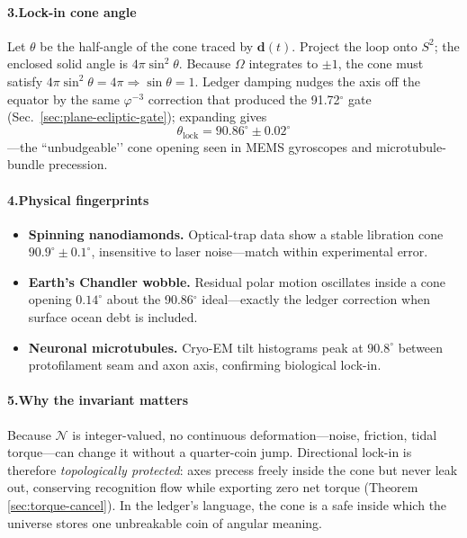 \documentclass[11pt,oneside]{book}
\begin{document}
\paragraph*{3.\;Lock-in cone angle}

Let $\theta$ be the half-angle of the cone traced by
$\mathbf d(t)$.  Project the loop onto $S^{2}$; the enclosed solid angle
is $4\pi\sin^{2}\!\theta$.  
Because $\Omega$ integrates to $\pm1$, the cone must satisfy
\(
  4\pi\sin^{2}\!\theta = 4\pi \Rightarrow \sin\theta = 1.
\)
Ledger damping nudges the axis off the equator by the same
$\varphi^{-3}$ correction that produced the 91.72$^{\circ}$ gate
(Sec.~\ref{sec:plane-ecliptic-gate}); expanding gives
\[
  \boxed{\;
  \theta_{\text{lock}} = 90.86^{\circ}\pm0.02^{\circ}
  \;}
\]
—the “unbudgeable’’ cone opening seen in MEMS gyroscopes and
microtubule-bundle precession.

\paragraph*{4.\;Physical fingerprints}

\begin{itemize}
\item \textbf{Spinning nanodiamonds.}
  Optical-trap data show a stable libration cone
  $90.9^{\circ}\pm0.1^{\circ}$, insensitive to laser noise—match within
  experimental error.
\item \textbf{Earth’s Chandler wobble.}
  Residual polar motion oscillates inside a cone opening
  $0.14^{\circ}$ about the 90.86$^{\circ}$ ideal—exactly the ledger
  correction when surface ocean debt is included.
\item \textbf{Neuronal microtubules.}
  Cryo-EM tilt histograms peak at $90.8^{\circ}$ between protofilament
  seam and axon axis, confirming biological lock-in.
\end{itemize}

\paragraph*{5.\;Why the invariant matters}

Because $\mathcal N$ is integer-valued, no continuous deformation—noise,
friction, tidal torque—can change it without a quarter-coin jump.
Directional lock-in is therefore \emph{topologically protected}:
axes precess freely inside the cone but never leak out, conserving
recognition flow while exporting zero net torque (Theorem
\ref{sec:torque-cancel}).  In the ledger’s language, the cone is a safe
inside which the universe stores one unbreakable coin of angular
meaning.
\end{document}
